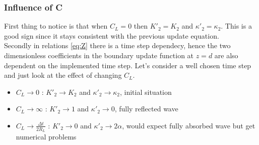 \subsubsection{Influence of C}

First thing to notice is that when $C_{L} = 0$ then $K'_{2} = K_{2}$ and $\kappa'_{2} = \kappa_{2}$. This is a good
sign since it stays consistent with the previous update equation.\\
Secondly in relations \ref{eq:Z} there is a time step dependecy, hence the two dimensionless
coefficients in the boundary update function at $z=d$ are also dependent on the implemented time step. Let's consider a
well chosen time step and just look at the effect of changing $C_{L}$.
\begin{itemize}
    \item $C_{L} \rightarrow 0$ :
        $K'_{2} \rightarrow K_{2}$ and $\kappa'_{2} \rightarrow \kappa_{2}$, initial situation
    \item $C_{L} \rightarrow \infty$ :
        $ K'_{2} \rightarrow 1$ and $\kappa'_{2} \rightarrow 0$, fully reflected wave
    \item $C_{L} \rightarrow \frac{\Delta t}{2R_{L}}$ :
        $K'_{2} \rightarrow 0$ and $\kappa'_{2} \rightarrow 2\alpha$, would expect fully absorbed wave but get numerical problems
\end{itemize}


